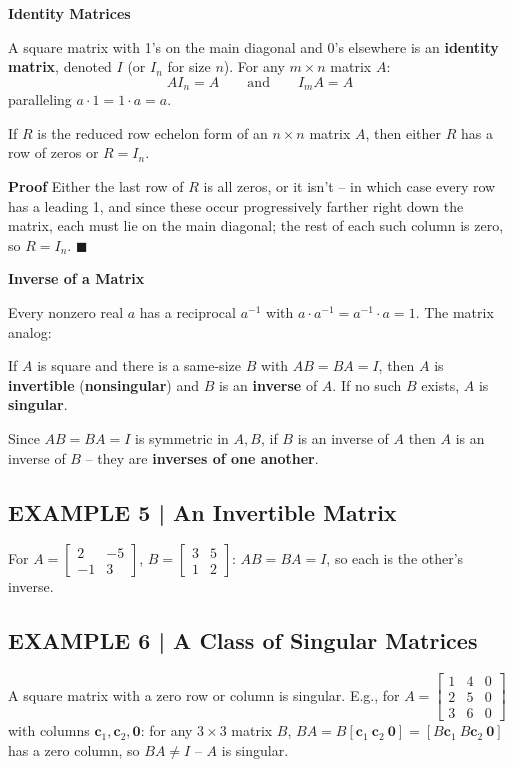 \documentclass{article}
\newcommand{\redheading}[1]{{\vspace{2mm}\noindent\Large\bfseries\color{red!55!black} #1\par}\vspace{2mm}}
\theoremstyle{mystyle}
\begin{document}
\redheading{Identity Matrices}

A square matrix with 1's on the main diagonal and 0's elsewhere is an \textbf{identity matrix}, denoted $I$ (or $I_n$ for size $n$). For any $m\times n$ matrix $A$:
\[
AI_n=A\qquad\text{and}\qquad I_mA=A
\]
paralleling $a\cdot1=1\cdot a=a$.

\begin{tcolorbox}[colback=red!4, colframe=red!60!black, title=Theorem 1.4.3, boxrule=0.5mm, arc=3mm]
If $R$ is the reduced row echelon form of an $n\times n$ matrix $A$, then either $R$ has a row of zeros or $R=I_n$.
\end{tcolorbox}
\textbf{Proof} Either the last row of $R$ is all zeros, or it isn't -- in which case every row has a leading 1, and since these occur progressively farther right down the matrix, each must lie on the main diagonal; the rest of each such column is zero, so $R=I_n$. $\blacksquare$

\redheading{Inverse of a Matrix}

Every nonzero real $a$ has a reciprocal $a^{-1}$ with $a\cdot a^{-1}=a^{-1}\cdot a=1$. The matrix analog:

\begin{tcolorbox}[colback=teal!4, colframe=teal!65!black, title=Definition 1, fonttitle=\bfseries, boxrule=0.5mm, arc=3mm]
If $A$ is square and there is a same-size $B$ with $AB=BA=I$, then $A$ is \textbf{invertible} (\textbf{nonsingular}) and $B$ is an \textbf{inverse} of $A$. If no such $B$ exists, $A$ is \textbf{singular}.
\end{tcolorbox}

Since $AB=BA=I$ is symmetric in $A,B$, if $B$ is an inverse of $A$ then $A$ is an inverse of $B$ -- they are \textbf{inverses of one another}.

\subsection*{EXAMPLE 5 | An Invertible Matrix}
For $A=\begin{bmatrix}2&-5\\-1&3\end{bmatrix}$, $B=\begin{bmatrix}3&5\\1&2\end{bmatrix}$: $AB=BA=I$, so each is the other's inverse.

\subsection*{EXAMPLE 6 | A Class of Singular Matrices}
A square matrix with a zero row or column is singular. E.g., for $A=\begin{bmatrix}1&4&0\\2&5&0\\3&6&0\end{bmatrix}$ with columns $\mathbf{c}_1,\mathbf{c}_2,\mathbf{0}$: for any $3\times3$ matrix $B$, $BA=B[\mathbf{c}_1\ \mathbf{c}_2\ \mathbf{0}]=[B\mathbf{c}_1\ B\mathbf{c}_2\ \mathbf{0}]$ has a zero column, so $BA\ne I$ -- $A$ is singular.
\end{document}
